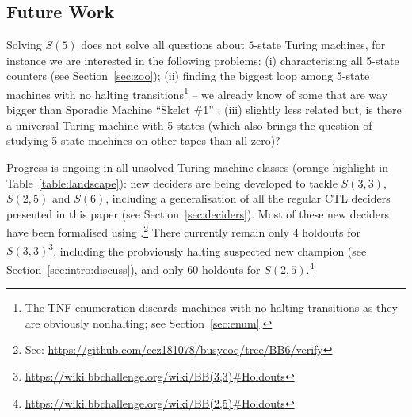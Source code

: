 \documentclass[a4paper,british]{article}
\theoremstyle{definition} %
\numberwithin{equation}{section}
\theoremstyle{definition} %
\begin{document}
















% 

\subsection{Future Work}\label{sec:fw}

Solving $S(5)$ does not solve all questions about $5$-state Turing machines, for instance we are interested in the following problems: (i) characterising all 5-state counters (see Section~\ref{sec:zoo}); (ii) finding the biggest loop among 5-state machines with no halting transitions\footnote{The TNF enumeration discards machines with no halting transitions as they are obviously nonhalting; see Section~\ref{sec:enum}.} -- we already know of some that are way bigger than Sporadic Machine ``Skelet \#1'' \cite{ligocki2022motherofgiants}; (iii) slightly less related but, is there a universal Turing machine with 5 states (which also brings the question of studying 5-state machines on other tapes than all-zero)?

Progress is ongoing in all unsolved Turing machine classes (orange highlight in Table~\ref{table:landscape}): new deciders are being developed to tackle $S(3,3)$, $S(2,5)$ and $S(6)$, including a generalisation of all the regular CTL deciders presented in this paper (see Section~\ref{sec:deciders}). Most of these new deciders have been formalised using \Coq.\footnote{See: \url{https://github.com/ccz181078/busycoq/tree/BB6/verify}} There currently remain only $4$ holdouts for $S(3,3)$\footnote{\url{https://wiki.bbchallenge.org/wiki/BB(3,3)\#Holdouts}}, including the probviously halting suspected new champion (see Section~\ref{sec:intro:discuss}), and only $60$ holdouts for $S(2,5)$.\footnote{\url{https://wiki.bbchallenge.org/wiki/BB(2,5)\#Holdouts}}
\end{document}

